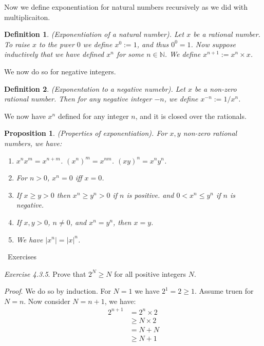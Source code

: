 \documentclass{article}
\newtheorem{definition}{Definition}[subsection]
\newtheorem{proposition}{Proposition}[subsection]
\newcommand{\N}{\mathbb{N}}
\newcommand{\exercisesline}{	%
    \begin{center}
    \textemdash\ Exercises\ \textemdash
    \end{center}
}
\let\it\textit
\begin{document}
Now we define exponentiation for natural numbers recursively as we
did with multiplicaiton. 

\begin{definition}
	(Exponentiation of a natural number). Let $x$ be a 
	rational number. To raise $x$ to the pwer $0$ 
	we define $x^{0} :=1$, and thus $0^0=1$. Now suppose 
	inductively that we have defined $x^{n}$ for some
	$n \in \N$. We define $x^{n+1} := x^{n} \times x$.
\end{definition}

We now do so for negative integers.

\begin{definition}
	(Exponentation to a negative numebr). Let $x$ be a non-zero 
	rational number. Then for any negative integer
	$-n$, we define $x^{-n} := 1/x^n$.
\end{definition}

We now have $x^n$ defined for any integer $n$, and it is closed 
over the rationals. 

\begin{proposition}
	(Properties of exponentiation). For $x,y$ non-zero 
	rational numbers, we have:
	\begin{enumerate}[label=(\alph*)]
		\item $x^n x^m = x^{n+m}$. $(x^n)^m = x^{nm}$. $(xy)^n = x^n y^n$.
		\item For $n>0$, $x^n =0$ iff $x=0$.
		\item If $x \geq y > 0$ then $x^n \geq y^n > 0$ if $n$ is positive.
			and $0 < x^n \leq y^n$ if $n$ is negative.
		\item If $x,y > 0$, $n \neq 0$, and $x^n = y^n$, then $x=y$.
		\item We have $|x^n| = |x|^n$.
	\end{enumerate}
\end{proposition}

\exercisesline

\it{Exercise 4.3.5}. Prove that $2^N \geq N$ for all positive integers $N$. 

\it{Proof}. We do so by induction. For $N=1$ we have $2^1 = 2 \geq 1$. 
Assume truen for $N=n$. Now consider $N=n+1$, we have:
\begin{align*}
	2^{n+1} &= 2^n \times 2 \\ 
		&\geq N \times 2 \tag*{By inductive assumption}\\ 
		&= N + N \\
		&\geq N + 1 \tag*{As $N \geq 1$}
\end{align*}
\end{document}
